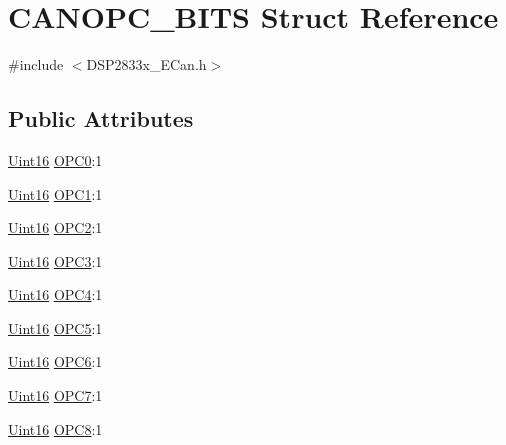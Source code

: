 \hypertarget{struct_c_a_n_o_p_c___b_i_t_s}{}\section{C\+A\+N\+O\+P\+C\+\_\+\+B\+I\+T\+S Struct Reference}
\label{struct_c_a_n_o_p_c___b_i_t_s}


{\ttfamily \#include $<$D\+S\+P2833x\+\_\+\+E\+Can.\+h$>$}

\subsection*{Public Attributes}
\begin{DoxyCompactItemize}
\item 
\hyperlink{_d_s_p2833x___device_8h_a59a9f6be4562c327cbfb4f7e8e18f08b}{Uint16} \hyperlink{struct_c_a_n_o_p_c___b_i_t_s_af38a14904c4fc34e92ba00ab08f0db06}{O\+P\+C0}\+:1
\item 
\hyperlink{_d_s_p2833x___device_8h_a59a9f6be4562c327cbfb4f7e8e18f08b}{Uint16} \hyperlink{struct_c_a_n_o_p_c___b_i_t_s_aa8622c18d71ac6166ecc591dcdd7e48c}{O\+P\+C1}\+:1
\item 
\hyperlink{_d_s_p2833x___device_8h_a59a9f6be4562c327cbfb4f7e8e18f08b}{Uint16} \hyperlink{struct_c_a_n_o_p_c___b_i_t_s_a780695a9c157031858c65414588d2270}{O\+P\+C2}\+:1
\item 
\hyperlink{_d_s_p2833x___device_8h_a59a9f6be4562c327cbfb4f7e8e18f08b}{Uint16} \hyperlink{struct_c_a_n_o_p_c___b_i_t_s_a4964262e398ac6a6822f159390ff01e4}{O\+P\+C3}\+:1
\item 
\hyperlink{_d_s_p2833x___device_8h_a59a9f6be4562c327cbfb4f7e8e18f08b}{Uint16} \hyperlink{struct_c_a_n_o_p_c___b_i_t_s_a273022f177439398cb3fbf10d0bebd10}{O\+P\+C4}\+:1
\item 
\hyperlink{_d_s_p2833x___device_8h_a59a9f6be4562c327cbfb4f7e8e18f08b}{Uint16} \hyperlink{struct_c_a_n_o_p_c___b_i_t_s_adba24bb701823146883d8da58a9ca196}{O\+P\+C5}\+:1
\item 
\hyperlink{_d_s_p2833x___device_8h_a59a9f6be4562c327cbfb4f7e8e18f08b}{Uint16} \hyperlink{struct_c_a_n_o_p_c___b_i_t_s_af72417d5578cc89a379a501ad9b3c347}{O\+P\+C6}\+:1
\item 
\hyperlink{_d_s_p2833x___device_8h_a59a9f6be4562c327cbfb4f7e8e18f08b}{Uint16} \hyperlink{struct_c_a_n_o_p_c___b_i_t_s_aa2320ae7586b39f0918c56e29ef44587}{O\+P\+C7}\+:1
\item 
\hyperlink{_d_s_p2833x___device_8h_a59a9f6be4562c327cbfb4f7e8e18f08b}{Uint16} \hyperlink{struct_c_a_n_o_p_c___b_i_t_s_a593ef6f63e734a94a9a85559148408bc}{O\+P\+C8}\+:1

\end{DoxyCompactItemize}
